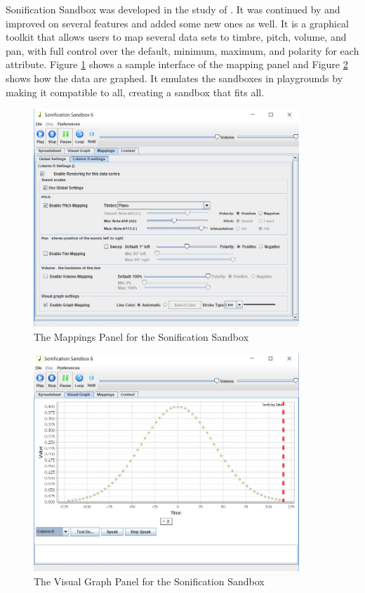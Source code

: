Sonification Sandbox was developed in the study of . It was continued by  and improved on several features and added some new ones as well. It is a graphical toolkit that allows users to map several data sets to timbre, pitch, volume, and pan, with full control over the default, minimum, maximum, and polarity for each attribute. Figure \ref{fig:Sonification_Mappings_Panel} shows a sample interface of the mapping panel and Figure \ref{fig:Sonification_Graph_Panel} shows how the data are graphed. It emulates the sandboxes in playgrounds by making it compatible to all, creating a sandbox that fits all. 

\begin{figure}[H]
    \centering
    \includegraphics[width=10cm]{figures/Sonification_Mappings_Panel.png}
    \caption{The Mappings Panel for the Sonification Sandbox \protect\cite{walker2003sonification}}
    \label{fig:Sonification_Mappings_Panel}
\end{figure}

\begin{figure}[H]
    \centering
    \includegraphics[width=10cm]{figures/Sonification_Graph_Panel.jpg}
    \caption{The Visual Graph Panel for the Sonification Sandbox \protect\cite{walker2003sonification}}
    \label{fig:Sonification_Graph_Panel}
\end{figure}

